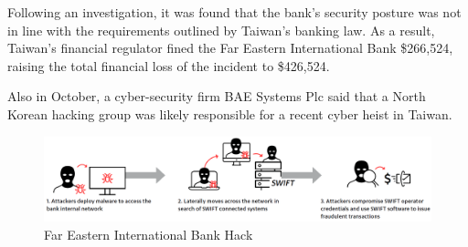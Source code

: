 \documentclass[12pt]{article}
\begin{document}
        Following an investigation, it was found that the bank’s security posture was not in line with the requirements outlined by Taiwan’s banking law. As a result, Taiwan’s financial regulator fined the Far Eastern International Bank \$266,524, raising the total financial loss of the incident to \$426,524.\cite{TaiwanFarEastern2017}
        
        Also in October, a cyber-security firm BAE Systems Plc said that a North Korean hacking group was likely responsible for a recent cyber heist in Taiwan.\cite{intelligenceBAESystemsThreat}
        
        \begin{figure}[H]
        \centering
        \includegraphics[width=\textwidth]{figures/fareast.png}
        \caption{Far Eastern International Bank Hack}
        \label{fig:FarEastHacks}
        \end{figure}
        
\end{document}
